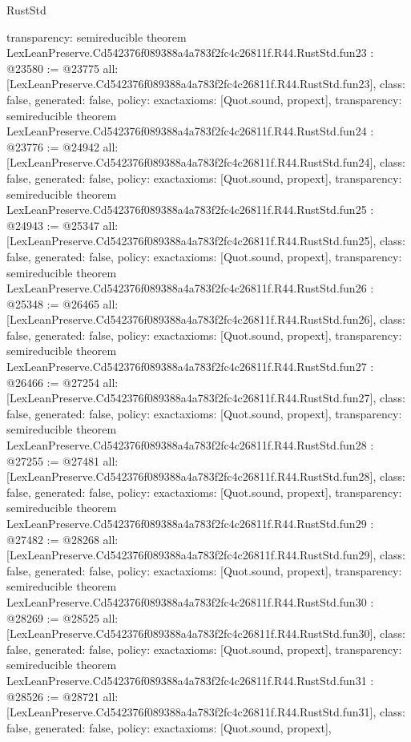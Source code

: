 \begin{lexlean}{RustStd}
\begin{coremodule}
{  transparency: semireducible
}
theorem LexLeanPreserve.Cd542376f089388a4a783f2fc4c26811f.R44.RustStd.fun23 : @23580 := @23775 {
  all: [LexLeanPreserve.Cd542376f089388a4a783f2fc4c26811f.R44.RustStd.fun23],
  class: false,
  generated: false,
  policy: exact{axioms: [Quot.sound, propext]},
  transparency: semireducible
}
theorem LexLeanPreserve.Cd542376f089388a4a783f2fc4c26811f.R44.RustStd.fun24 : @23776 := @24942 {
  all: [LexLeanPreserve.Cd542376f089388a4a783f2fc4c26811f.R44.RustStd.fun24],
  class: false,
  generated: false,
  policy: exact{axioms: [Quot.sound, propext]},
  transparency: semireducible
}
theorem LexLeanPreserve.Cd542376f089388a4a783f2fc4c26811f.R44.RustStd.fun25 : @24943 := @25347 {
  all: [LexLeanPreserve.Cd542376f089388a4a783f2fc4c26811f.R44.RustStd.fun25],
  class: false,
  generated: false,
  policy: exact{axioms: [Quot.sound, propext]},
  transparency: semireducible
}
theorem LexLeanPreserve.Cd542376f089388a4a783f2fc4c26811f.R44.RustStd.fun26 : @25348 := @26465 {
  all: [LexLeanPreserve.Cd542376f089388a4a783f2fc4c26811f.R44.RustStd.fun26],
  class: false,
  generated: false,
  policy: exact{axioms: [Quot.sound, propext]},
  transparency: semireducible
}
theorem LexLeanPreserve.Cd542376f089388a4a783f2fc4c26811f.R44.RustStd.fun27 : @26466 := @27254 {
  all: [LexLeanPreserve.Cd542376f089388a4a783f2fc4c26811f.R44.RustStd.fun27],
  class: false,
  generated: false,
  policy: exact{axioms: [Quot.sound, propext]},
  transparency: semireducible
}
theorem LexLeanPreserve.Cd542376f089388a4a783f2fc4c26811f.R44.RustStd.fun28 : @27255 := @27481 {
  all: [LexLeanPreserve.Cd542376f089388a4a783f2fc4c26811f.R44.RustStd.fun28],
  class: false,
  generated: false,
  policy: exact{axioms: [Quot.sound, propext]},
  transparency: semireducible
}
theorem LexLeanPreserve.Cd542376f089388a4a783f2fc4c26811f.R44.RustStd.fun29 : @27482 := @28268 {
  all: [LexLeanPreserve.Cd542376f089388a4a783f2fc4c26811f.R44.RustStd.fun29],
  class: false,
  generated: false,
  policy: exact{axioms: [Quot.sound, propext]},
  transparency: semireducible
}
theorem LexLeanPreserve.Cd542376f089388a4a783f2fc4c26811f.R44.RustStd.fun30 : @28269 := @28525 {
  all: [LexLeanPreserve.Cd542376f089388a4a783f2fc4c26811f.R44.RustStd.fun30],
  class: false,
  generated: false,
  policy: exact{axioms: [Quot.sound, propext]},
  transparency: semireducible
}
theorem LexLeanPreserve.Cd542376f089388a4a783f2fc4c26811f.R44.RustStd.fun31 : @28526 := @28721 {
  all: [LexLeanPreserve.Cd542376f089388a4a783f2fc4c26811f.R44.RustStd.fun31],
  class: false,
  generated: false,
  policy: exact{axioms: [Quot.sound, propext]},
}
\end{coremodule}
\end{lexlean}
